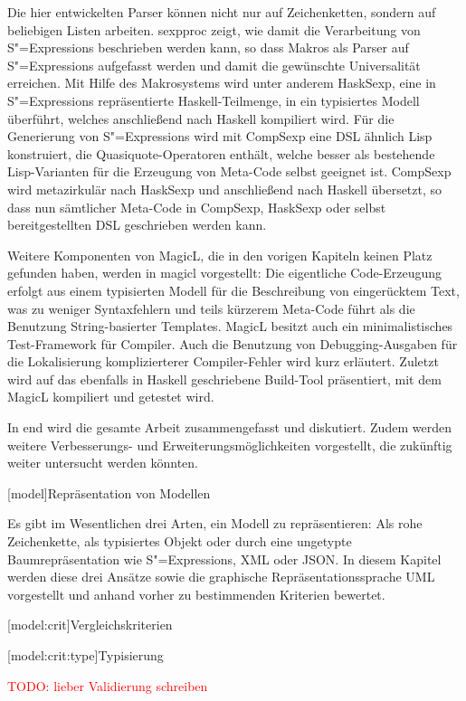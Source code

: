 \documentclass[11pt, a4paper, bibgerm]{book}
\newcommand{\todo}[1]{
  \textcolor{red}{TODO: #1}
}
\newcommand\lchapter{}
\newcommand\lsection{}
\newcommand\lsubsection{}
\newcommand\cref{}
\newcommand{\sexps}{S"=Expressions}
\begin{document}
Die hier entwickelten Parser können nicht nur auf Zeichenketten, sondern
auf beliebigen Listen arbeiten. \cref{sexpproc} zeigt, wie damit die
Verarbeitung von \sexps{} beschrieben werden kann, so dass Makros als
Parser auf \sexps{} aufgefasst werden und damit die gewünschte
Universalität erreichen. Mit Hilfe des Makrosystems wird unter anderem
HaskSexp, eine in \sexps{} repräsentierte Haskell-Teilmenge, in ein
typisiertes Modell überführt, welches anschließend nach Haskell
kompiliert wird. Für die Generierung von \sexps{} wird mit CompSexp eine
DSL ähnlich Lisp konstruiert, die Quasiquote-Operatoren enthält, welche
besser als bestehende Lisp-Varianten für die Erzeugung von Meta-Code
selbst geeignet ist. CompSexp wird metazirkulär nach HaskSexp und
anschließend nach Haskell übersetzt, so dass nun sämtlicher Meta-Code in
CompSexp, HaskSexp oder selbst bereitgestellten DSL geschrieben werden
kann.

Weitere Komponenten von MagicL, die in den vorigen Kapiteln keinen Platz
gefunden haben, werden in \cref{magicl} vorgestellt: Die eigentliche
Code-Erzeugung erfolgt aus einem typisierten Modell für die Beschreibung
von eingerücktem Text, was zu weniger Syntaxfehlern und teils kürzerem
Meta-Code führt als die Benutzung String-basierter Templates. MagicL
besitzt auch ein minimalistisches Test-Framework für Compiler. Auch die
Benutzung von Debugging-Ausgaben für die Lokalisierung komplizierterer
Compiler-Fehler wird kurz erläutert. Zuletzt wird auf das ebenfalls in
Haskell geschriebene Build-Tool präsentiert, mit dem MagicL kompiliert
und getestet wird.

In \cref{end} wird die gesamte Arbeit zusammengefasst und
diskutiert. Zudem werden weitere Verbesserungs- und
Erweiterungsmöglichkeiten vorgestellt, die zukünftig weiter untersucht
werden könnten.

\lchapter[model]{Repräsentation von Modellen}

Es gibt im Wesentlichen drei Arten, ein Modell zu repräsentieren: Als
rohe Zeichenkette, als typisiertes Objekt oder durch eine ungetypte
Baumrepräsentation wie \sexps{}, XML oder JSON. In diesem Kapitel
werden diese drei Ansätze sowie die graphische Repräsentationssprache
UML vorgestellt und anhand vorher zu bestimmenden Kriterien bewertet.

\lsection[model:crit]{Vergleichskriterien}

\lsubsection[model:crit:type]{Typisierung}

\todo{lieber Validierung schreiben}
\end{document}
